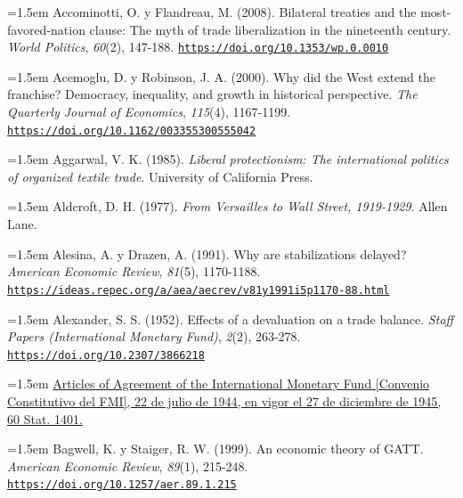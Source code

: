 \documentclass[10pt,a4paper]{article}
\begin{document}
{\sloppy\noindent\hangindent=1.5em Accominotti, O. y Flandreau, M. (2008). Bilateral treaties and the most-favored-nation clause: The myth of trade liberalization in the nineteenth century. \textit{World Politics}, \textit{60}(2), 147-188. \href{https://doi.org/10.1353/wp.0.0010}{\nolinkurl{https://doi.org/10.1353/wp.0.0010}}\par}

{\sloppy\noindent\hangindent=1.5em Acemoglu, D. y Robinson, J. A. (2000). Why did the West extend the franchise? Democracy, inequality, and growth in historical perspective. \textit{The Quarterly Journal of Economics}, \textit{115}(4), 1167-1199. \href{https://doi.org/10.1162/003355300555042}{\nolinkurl{https://doi.org/10.1162/003355300555042}}\par}

{\sloppy\noindent\hangindent=1.5em Aggarwal, V. K. (1985). \textit{Liberal protectionism: The international politics of organized textile trade}. University of California Press.\par}

{\sloppy\noindent\hangindent=1.5em Aldcroft, D. H. (1977). \textit{From Versailles to Wall Street, 1919-1929}. Allen Lane.\par}

{\sloppy\noindent\hangindent=1.5em Alesina, A. y Drazen, A. (1991). Why are stabilizations delayed? \textit{American Economic Review}, \textit{81}(5), 1170-1188. \href{https://ideas.repec.org/a/aea/aecrev/v81y1991i5p1170-88.html}{\nolinkurl{https://ideas.repec.org/a/aea/aecrev/v81y1991i5p1170-88.html}}\par}

{\sloppy\noindent\hangindent=1.5em Alexander, S. S. (1952). Effects of a devaluation on a trade balance. \textit{Staff Papers (International Monetary Fund)}, \textit{2}(2), 263-278. \href{https://doi.org/10.2307/3866218}{\nolinkurl{https://doi.org/10.2307/3866218}}\par}

{\sloppy\noindent\hangindent=1.5em \href{https://www.govinfo.gov/content/pkg/STATUTE-60/pdf/STATUTE-60-Pg1401.pdf}{Articles of Agreement of the International Monetary Fund [Convenio Constitutivo del FMI], 22 de julio de 1944, en vigor el 27 de diciembre de 1945, 60 Stat. 1401.}\par}

{\sloppy\noindent\hangindent=1.5em Bagwell, K. y Staiger, R. W. (1999). An economic theory of GATT. \textit{American Economic Review}, \textit{89}(1), 215-248. \href{https://doi.org/10.1257/aer.89.1.215}{\nolinkurl{https://doi.org/10.1257/aer.89.1.215}}\par}
\end{document}
